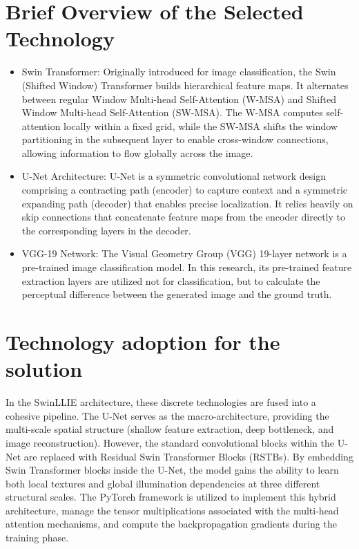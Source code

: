 \documentclass[12pt, a4paper]{report}
\begin{document}
\section{Brief Overview of the Selected Technology}
\begin{itemize}
    \item Swin Transformer: Originally introduced for image classification, the Swin (Shifted Window) Transformer builds hierarchical feature maps. It alternates between regular Window Multi-head Self-Attention (W-MSA) and Shifted Window Multi-head Self-Attention (SW-MSA). The W-MSA computes self-attention locally within a fixed grid, while the SW-MSA shifts the window partitioning in the subsequent layer to enable cross-window connections, allowing information to flow globally across the image.
    \item U-Net Architecture: U-Net is a symmetric convolutional network design comprising a contracting path (encoder) to capture context and a symmetric expanding path (decoder) that enables precise localization. It relies heavily on skip connections that concatenate feature maps from the encoder directly to the corresponding layers in the decoder.
    \item VGG-19 Network: The Visual Geometry Group (VGG) 19-layer network is a pre-trained image classification model. In this research, its pre-trained feature extraction layers are utilized not for classification, but to calculate the perceptual difference between the generated image and the ground truth.
\end{itemize}

\section{Technology adoption for the solution}
In the SwinLLIE architecture, these discrete technologies are fused into a cohesive pipeline. The U-Net serves as the macro-architecture, providing the multi-scale spatial structure (shallow feature extraction, deep bottleneck, and image reconstruction). However, the standard convolutional blocks within the U-Net are replaced with Residual Swin Transformer Blocks (RSTBs). By embedding Swin Transformer blocks inside the U-Net, the model gains the ability to learn both local textures and global illumination dependencies at three different structural scales. The PyTorch framework is utilized to implement this hybrid architecture, manage the tensor multiplications associated with the multi-head attention mechanisms, and compute the backpropagation gradients during the training phase.
\end{document}
